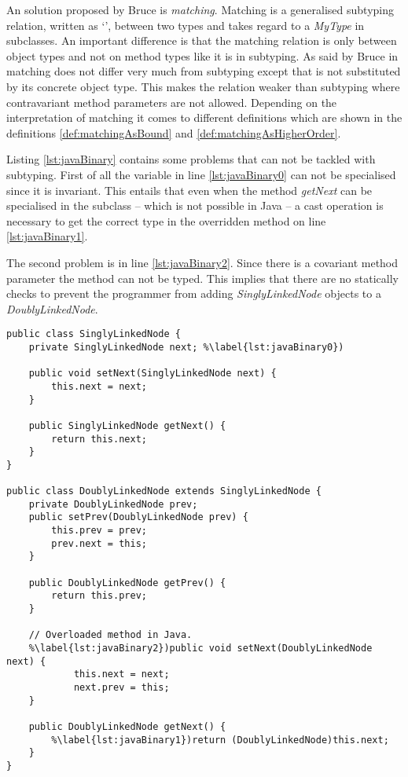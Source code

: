 An solution proposed by Bruce \cite{bruce_binary_1995} is
\emph{matching}. Matching is a generalised subtyping relation, written
as `\match', between two types and takes regard to a \emph{MyType} in
subclasses. An important difference is that the matching relation is only
between object types and not on method types like it is in subtyping. As
said by Bruce in \cite{bruce_foundations_2002} matching does not differ
very much from subtyping except that \mytype is not substituted by its
concrete object type. This makes the relation weaker than subtyping
where contravariant method parameters are not allowed. Depending
on the interpretation of matching it comes to different
definitions which are shown in the definitions
\ref{def:matchingAsBound} and \ref{def:matchingAsHigherOrder}.

Listing \ref{lst:javaBinary} contains some problems that can not be tackled
with subtyping. First of all the variable in line \ref{lst:javaBinary0} can
not be specialised since it is invariant. This entails that even when the
method \emph{getNext} can be specialised in the subclass -- which is not possible
in Java -- a cast operation is necessary to get the correct type in the overridden
method on line \ref{lst:javaBinary1}.

The second problem is in line \ref{lst:javaBinary2}. Since there is a covariant
method parameter the method can not be typed. This implies that there are no statically
checks to prevent the programmer from adding \emph{SinglyLinkedNode} objects to a
\emph{DoublyLinkedNode}.

\begin{lstlisting}[float=h,caption={Illegal subtyping of binary methods in Java},label={lst:javaBinary}]
public class SinglyLinkedNode {
	private SinglyLinkedNode next; %\label{lst:javaBinary0})

	public void setNext(SinglyLinkedNode next) {
		this.next = next;
	}

	public SinglyLinkedNode getNext() {
		return this.next;
	}
}

public class DoublyLinkedNode extends SinglyLinkedNode {
	private DoublyLinkedNode prev;
	public setPrev(DoublyLinkedNode prev) {
		this.prev = prev;
		prev.next = this;
	}

	public DoublyLinkedNode getPrev() {
		return this.prev;
	}
	
	// Overloaded method in Java.
	%\label{lst:javaBinary2})public void setNext(DoublyLinkedNode next) {
			this.next = next;
			next.prev = this;
	}

	public DoublyLinkedNode getNext() {
		%\label{lst:javaBinary1})return (DoublyLinkedNode)this.next;
	}
}
\end{lstlisting}

